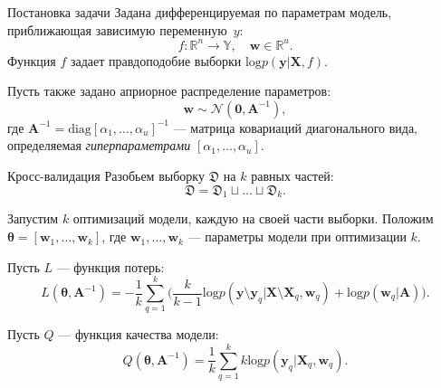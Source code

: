 \documentclass[10pt,pdf,utf8,russian,aspectratio=169]{beamer}
\begin{document}
\begin{frame}{Постановка задачи}
Задана дифференцируемая по параметрам модель, приближающая зависимую переменную~$y$:
\[
	f:\mathbb{R}^n \to \mathbb{Y}, \quad \mathbf{w} \in \mathbb{R}^u.
\]
Функция $f$ задает правдоподобие выборки $\text{log}p(\mathbf{y}|\mathbf{X}, f)$. 

Пусть также задано априорное распределение параметров: $$\mathbf{w} \sim \mathcal{N}(\mathbf{0}, \mathbf{A}^{-1}),$$
где $\mathbf{A}^{-1} = \text{diag}[\alpha_1, \dots, \alpha_u]^{-1}$ --- матрица ковариаций диагонального вида, определяемая \textit{гиперпараметрами} $[\alpha_1, \dots, \alpha_u]$.
\end{frame}
\begin{frame}{Кросс-валидация}
Разобьем выборку $\mathfrak{D}$ на $k$ равных частей:
\[
\mathfrak{D} = \mathfrak{D}_1 \sqcup \dots \sqcup \mathfrak{D}_k.
\]


Запустим $k$ оптимизаций модели, каждую на своей части выборки. Положим $\boldsymbol{\theta} = [\mathbf{w}_1, \dots, \mathbf{w}_k]$, где $\mathbf{w}_1, \dots, \mathbf{w}_k$ --- параметры модели при оптимизации $k$.
 
Пусть $L$ --- функция потерь:
\begin{equation}
\label{eq:cv}
L(\boldsymbol{\theta}, \mathbf{A}^{-1}) = -\frac{1}{k}\sum_{q=1}^k \bigl(\frac{k}{k-1}\text{log}p(\mathbf{y} \setminus \mathbf{y}_q|\mathbf{X}\setminus \mathbf{X}_q, \mathbf{w}_q) + \text{log}p(\mathbf{w}_q|\mathbf{A})\bigr).
\end{equation}

Пусть $Q$ --- функция качества модели:
\[
Q(\boldsymbol{\theta}, \mathbf{A}^{-1}) = \frac{1}{k}\sum_{q=1}^k k\text{log}p(\mathbf{y}_q|\mathbf{X}_q, \mathbf{w}_q).
\]

\end{frame}
\end{document}
